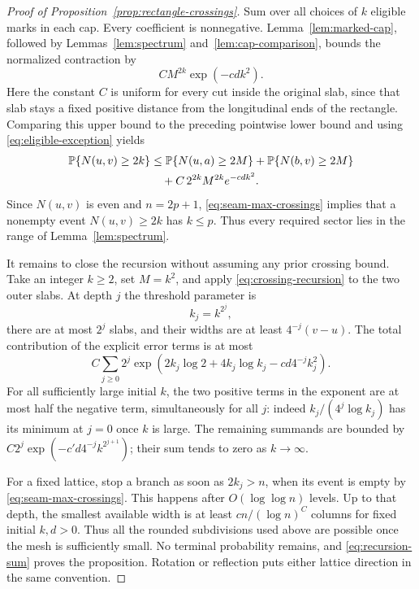 \begin{proof}[Proof of Proposition~\ref{prop:rectangle-crossings}]
Sum over all choices of $k$ eligible marks in each cap.  Every coefficient
is nonnegative.  Lemma~\ref{lem:marked-cap}, followed by
Lemmas~\ref{lem:spectrum} and~\ref{lem:cap-comparison}, bounds the
normalized contraction by
\[
 C M^{2k}\exp(-c d k^2).
\]
Here the constant $C$ is uniform for every cut inside the original slab,
since that slab stays a fixed positive distance from the longitudinal
ends of the rectangle.  Comparing this upper bound to the preceding
pointwise lower bound and using \eqref{eq:eligible-exception} yields
\begin{align}
 \mathbb P\{N(u,v)\ge2k\}
 &\le \mathbb P\{N(u,a)\ge2M\}
       +\mathbb P\{N(b,v)\ge2M\}\notag\\
 &\quad+C\,2^{2k}M^{2k}e^{-c d k^2}.
 \label{eq:crossing-recursion}
\end{align}
Since $N(u,v)$ is even and $n=2p+1$, \eqref{eq:seam-max-crossings}
implies that a nonempty event $N(u,v)\ge2k$ has $k\le p$.
Thus every required sector lies in the range of
Lemma~\ref{lem:spectrum}.

It remains to close the recursion without assuming any prior crossing
bound.  Take an integer $k\ge2$, set $M=k^2$, and apply
\eqref{eq:crossing-recursion} to the two outer slabs.  At depth $j$ the
threshold parameter is
\[
 k_j=k^{2^j},
\]
there are at most $2^j$ slabs, and their widths are at least
$4^{-j}(v-u)$.  The total contribution of the explicit error terms is
at most
\begin{equation}\label{eq:recursion-sum}
 C\sum_{j\ge0}2^j
 \exp\!\left(2k_j\log2+4k_j\log k_j
                      -c d4^{-j}k_j^2\right).
\end{equation}
For all sufficiently large initial $k$, the two positive terms in the
exponent are at most half the negative term, simultaneously for all
$j$: indeed $k_j/(4^j\log k_j)$ has its minimum at $j=0$ once $k$ is
large.  The remaining summands are bounded by
$C2^j\exp(-c' d4^{-j}k^{2^{j+1}})$; their sum tends to zero as
$k\to\infty$.

For a fixed lattice, stop a branch as soon as $2k_j>n$, when its event
is empty by \eqref{eq:seam-max-crossings}.  This happens after
$O(\log\log n)$ levels.  Up to that depth, the smallest available width
is at least $c n/(\log n)^C$ columns for fixed initial $k,d>0$.
Thus all the rounded subdivisions used above are possible once the
mesh is sufficiently small.  No terminal probability remains, and
\eqref{eq:recursion-sum} proves the proposition.  Rotation or reflection
puts either lattice direction in the same convention.
\end{proof}
